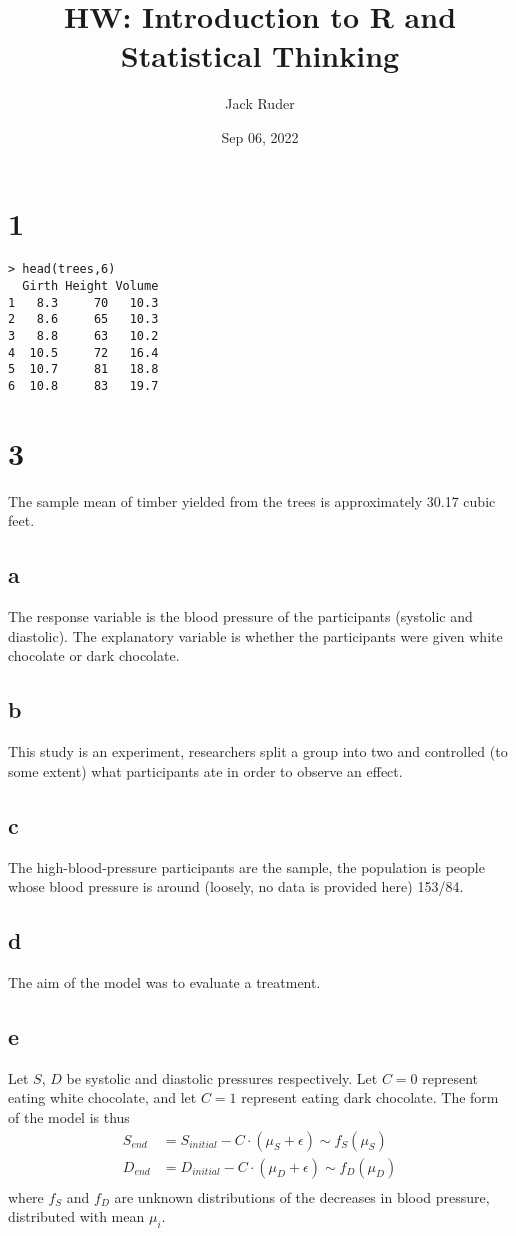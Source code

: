 \documentclass[a4paper]{article}
\title{HW: Introduction to R and Statistical Thinking}
\date{Sep 06, 2022}
\author{Jack Ruder}
\begin{document}
\doublespacing
\maketitle

\section*{1}
\begin{verbatim}
> head(trees,6)
  Girth Height Volume
1   8.3     70   10.3
2   8.6     65   10.3
3   8.8     63   10.2
4  10.5     72   16.4
5  10.7     81   18.8
6  10.8     83   19.7
\end{verbatim}

\section*{3}
The sample mean of timber yielded from the trees is approximately 30.17 cubic feet.
\subsection*{a}
The response variable is the blood pressure of the participants (systolic and diastolic). The explanatory variable is whether the participants were given white chocolate or dark chocolate.
\subsection*{b}
This study is an experiment, researchers split a group into two and controlled (to some extent) what participants ate in order to observe an effect.
\subsection*{c}
The high-blood-pressure participants are the sample, the population is people whose blood pressure is around (loosely, no data is provided here) 153/84.
\subsection*{d}
The aim of the model was to evaluate a treatment.
\subsection*{e}
Let \(S\), \(D\) be systolic and diastolic pressures respectively. Let \(C = 0\) represent eating white chocolate, and let \(C = 1\) represent eating dark chocolate.
The form of the model is thus 
\begin{align*}
	S_{end} &= S_{initial} - C \cdot (\mu_S + \epsilon) \sim f_S(\mu_S) \\
	D_{end} &= D_{initial} - C \cdot (\mu_D + \epsilon) \sim f_D(\mu_D) \\
\end{align*}
where \(f_S\) and \(f_D\) are unknown distributions of the decreases in blood pressure, distributed with mean \(\mu_i\). 
\end{document}
